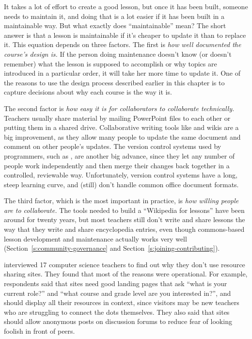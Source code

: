 It takes a lot of effort to create a good lesson, but once it has been
built, someone needs to maintain it, and doing that is a lot easier if
it has been built in a maintainable way. But what exactly does
``maintainable'' mean? The short answer is that a lesson is maintainable
if it's cheaper to update it than to replace it. This equation depends
on three factors. The first is \emph{how well documented the course's
design is.} If the person doing maintenance doesn't know (or doesn't
remember) what the lesson is supposed to accomplish or why topics are
introduced in a particular order, it will take her more time to update
it. One of the reasons to use the design process described earlier in
this chapter is to capture decisions about why each course is the way
it is.

The second factor is \emph{how easy it is for collaborators to collaborate
technically.} Teachers usually share material by mailing PowerPoint
files to each other or putting them in a shared drive. Collaborative
writing tools like  and wikis are
a big improvement, as they allow many people to update the same
document and comment on other people's updates. The version control
systems used by programmers, such as , are
another big advance, since they let any number of people work
independently and then merge their changes back together in a
controlled, reviewable way. Unfortunately, version control systems
have a long, steep learning curve, and (still) don't handle common
office document formats.

The third factor, which is the most important in practice, is \emph{how
willing people are to collaborate.} The tools needed to build a
``Wikipedia for lessons'' have been around for twenty years, but most
teachers still don't write and share lessons the way that they write
and share encyclopedia entries, even though commons-based lesson
development and maintenance actually works very well
(Section~\ref{s:community-governance} and
Section~\ref{s:joining-contributing}).

\cite{Leak2017} interviewed 17 computer science teachers to find
out why they don't use resource sharing sites. They found that most of
the reasons were operational. For example, respondents said that sites
need good landing pages that ask ``what is your current role?'' and
``what course and grade level are you interested in?'', and should
display all their resources in context, since visitors may be new
teachers who are struggling to connect the dots themselves. They also
said that sites should allow anonymous posts on discussion forums to
reduce fear of looking foolish in front of peers.


